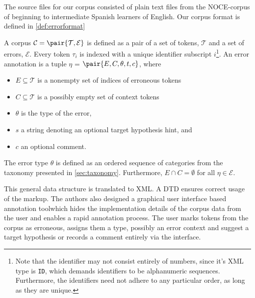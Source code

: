 \documentclass[12pt]{article}
\begin{document}
The source files for our corpus consisted of plain text files from the
NOCE-corpus %
of beginning to intermediate Spanish learners of English. Our corpus
format is defined in \ref{def:errorformat}

\begin{definition}\label{def:errorformat}

A corpus $\mathcal{C}=\pair{\mathcal{T},\mathcal{E}}$ is defined as a pair of
a set of tokens, $\mathcal{T}$ and a 
set of errors, $\mathcal{E}$. Every token $\tau_i$ is indexed with a unique
identifier subscript $i$\footnote{Note that the identifier may not consist entirely of
numbers, since it's XML type is \texttt{ID}, which demands identifiers to be
alphanumeric sequences. Furthermore, the identifiers need not adhere to any
particular order, as long as they are unique.}.
An error annotation is a tuple $\eta$ = $\pair{E,C,\theta,t,c}$, where
\begin{itemize}
  \item $E \subseteq \mathcal{T}$ is a nonempty set of indices of erroneous tokens
  \item $C \subseteq \mathcal{T}$ is a possibly empty set of context tokens
  \item $\theta$ is the type of the error,
  \item $s$ a string denoting an optional target hypothesis hint, and
  \item $c$ an optional comment.
\end{itemize}

The error type $\theta$ is defined as an ordered sequence of categories from the
taxonomy presented in \ref{sec:taxonomy}. Furthermore, $E \cap C = \emptyset$
for all $\eta\in\mathcal{E}$.

\end{definition}

This general data structure is translated to XML. A DTD ensures correct usage of
the markup. The authors also designed a graphical user interface based
annotation tool\footnotemark which hides the implementation details of the
corpus data from the user and enables a rapid annotation process. The user marks
tokens from the corpus as erroneous, assigns them a type, possibly an error
context and suggest a target hypothesis or records a comment entirely via the
interface.


\end{document}
